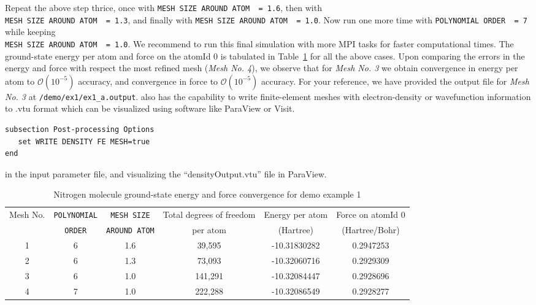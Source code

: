 \begin{enumerate}
Repeat the above step thrice, once with \verb|MESH SIZE AROUND ATOM  = 1.6|, then with\\ \verb|MESH SIZE AROUND ATOM  = 1.3|, and finally with \verb|MESH SIZE AROUND ATOM  = 1.0|. Now run one more time with \verb|POLYNOMIAL ORDER  = 7| while keeping \\ \verb|MESH SIZE AROUND ATOM  = 1.0|. We recommend to run this final simulation with more MPI tasks for faster computational times. The ground-state energy per atom and force on the atomId 0 is tabulated in Table~\ref{tab:table1} for all the above cases. Upon comparing the errors in the energy and force with respect the most refined mesh (\emph{Mesh No. 4}), we observe that for \emph{Mesh No. 3} we obtain convergence in energy per atom to $\mathcal{O}(10^{-5})$ accuracy, and convergence in force to $\mathcal{O}(10^{-5})$ accuracy. For your reference, we have provided the output file for \emph{Mesh No. 3} at \verb|/demo/ex1/ex1_a.output|. \dftfe{} also has the capability to write finite-element meshes with electron-density or wavefunction information to .vtu format which can be visualized using software like ParaView or Visit.
\begin{verbatim}
subsection Post-processing Options
   set WRITE DENSITY FE MESH=true
end
\end{verbatim}
in the input parameter file, and visualizing the ``densityOutput.vtu'' file in ParaView.
\begin{table}[h!]
  \begin{center}
\small	  
    \caption{Nitrogen molecule ground-state energy and force convergence for demo example 1}
    \label{tab:table1}
    \begin{tabular}{c|c|c|c|c|c}
	    \hline\hline
	    Mesh No. &\verb|POLYNOMIAL| &\verb|MESH SIZE| & Total degrees of freedom& Energy per atom & Force on atomId 0\\
	    &\verb|ORDER| &\verb|AROUND ATOM| & per atom  & (Hartree) & (Hartree/Bohr) \\
      \hline\hline
	    1& 6 & 1.6 & 39,595 & -10.31830282 &  0.2947253\\
	    2&6 & 1.3 &  73,093&  -10.32060716 &  0.2929309\\
	    3&6 & 1.0 & 141,291 & -10.32084447 &  0.2928696\\
	    4&7 & 1.0 & 222,288 & -10.32086549 &  0.2928277\\
	  \hline\hline
    \end{tabular}
  \end{center}
\end{table}


\end{enumerate}
